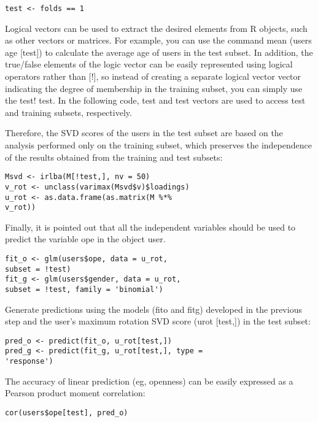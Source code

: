 \begin{verbatim}
test <- folds == 1
\end{verbatim}

Logical vectors can be used to extract the desired elements from R
 objects, such as other vectors or matrices. For example, you can 
use the command mean (users age [test]) to calculate the average age
 of users in the test subset. In addition, the true/false elements
 of the logic vector can be easily represented using logical 
operators rather than [!], so instead of creating a separate 
logical vector vector indicating the degree of membership in the 
training subset, you can simply use the test! test. In the 
following code, test and test vectors are used to access test and 
training subsets, respectively.

Therefore, the SVD scores of the users in the test subset are based
 on the analysis performed only on the training subset, which 
preserves the independence of the results obtained from the 
training and test subsets:

\begin{verbatim}
Msvd <- irlba(M[!test,], nv = 50)
v_rot <- unclass(varimax(Msvd$v)$loadings)
u_rot <- as.data.frame(as.matrix(M %*%
v_rot))
\end{verbatim}

Finally, it is pointed out that all the independent variables 
should be used to predict the variable ope in the object user.

\begin{verbatim}
fit_o <- glm(users$ope, data = u_rot,
subset = !test)
fit_g <- glm(users$gender, data = u_rot,
subset = !test, family = 'binomial')
\end{verbatim}

Generate predictions using the models (fito and fitg) developed in
 the previous step and the user's maximum rotation SVD score 
(urot [test,]) in the test subset:

\begin{verbatim}
pred_o <- predict(fit_o, u_rot[test,])
pred_g <- predict(fit_g, u_rot[test,], type =
'response')
\end{verbatim}

The accuracy of linear prediction (eg, openness) can be easily 
expressed as a Pearson product moment correlation:

\begin{verbatim}
cor(users$ope[test], pred_o)
\end{verbatim}

